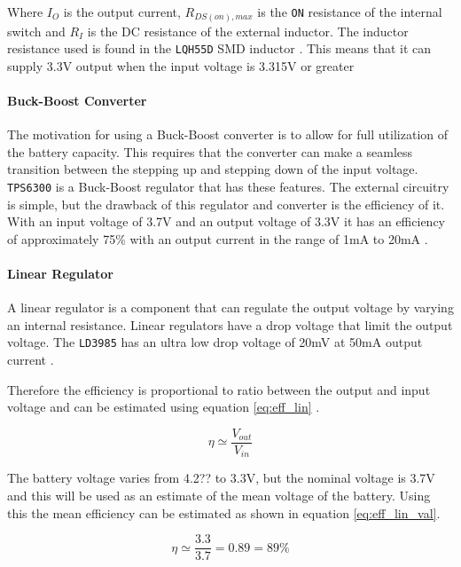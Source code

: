 Where $I_O$ is the output current, $R_{DS(on),max}$ is the \texttt{ON} resistance of the internal switch and $R_I$ is the DC resistance of the external inductor.
The inductor resistance used is found in the \texttt{LQH55D} SMD inductor \cite{LQH55D}.
This means that it can supply 3.3V output when the input voltage is 3.315V or greater



\paragraph{Buck-Boost Converter}
The motivation for using a Buck-Boost converter is to allow for full utilization of the battery capacity.
This requires that the converter can make a seamless transition between the stepping up and stepping down of the input voltage. 
\texttt{TPS6300} is a Buck-Boost regulator that has these features.
The external circuitry is simple, but the drawback of this regulator and converter is the efficiency of it.
With an input voltage of 3.7V and an output voltage of 3.3V it has an efficiency of approximately 75\% with an output current in the range of 1mA to 20mA \cite{TPS6300}.

\paragraph{Linear Regulator}
A linear regulator is a component that can regulate the output voltage by varying an internal resistance.
Linear regulators have a drop voltage that limit the output voltage. 
The \texttt{LD3985} has an ultra low drop voltage of 20mV at 50mA output current \cite{LD3985}.

Therefore the efficiency is proportional to ratio between the output and input voltage and can be estimated using equation \ref{eq:eff_lin} \cite{ap_note_140}.

\begin{equation}
	\eta \simeq \frac{V_{out}}{V_{in}}
	\label{eq:eff_lin}
\end{equation}

The battery voltage varies from 4.2?? to 3.3V, but the nominal voltage is 3.7V and this will be used as an estimate of the mean voltage of the battery.
Using this the mean efficiency can be estimated as shown in equation \ref{eq:eff_lin_val}.

\begin{equation}
	\eta \simeq \frac{3.3}{3.7} = 0.89 = 89\%
	\label{eq:eff_lin_val}
\end{equation}


